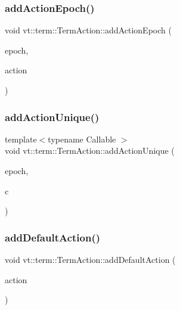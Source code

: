 \subsubsection{\texorpdfstring{add\+Action\+Epoch()}{addActionEpoch()}}
{\footnotesize\ttfamily void vt\+::term\+::\+Term\+Action\+::add\+Action\+Epoch (\begin{DoxyParamCaption}\item[{\hyperlink{namespacevt_a81d11b28122d43bf9834577e4a06440f}{Epoch\+Type} const \&}]{epoch,  }\item[{\hyperlink{namespacevt_ae0a5a7b18cc99d7b732cb4d44f46b0f3}{Action\+Type}}]{action }\end{DoxyParamCaption})}

\mbox{\label{structvt_1_1term_1_1_term_action_a3ccd1689f56ab62821cfa6b1e65fc60b}} 
\subsubsection{\texorpdfstring{add\+Action\+Unique()}{addActionUnique()}}
{\footnotesize\ttfamily template$<$typename Callable $>$ \\
void vt\+::term\+::\+Term\+Action\+::add\+Action\+Unique (\begin{DoxyParamCaption}\item[{\hyperlink{namespacevt_a81d11b28122d43bf9834577e4a06440f}{Epoch\+Type} const \&}]{epoch,  }\item[{Callable \&\&}]{c }\end{DoxyParamCaption})}

\mbox{\label{structvt_1_1term_1_1_term_action_a9e9e174482720b4886ea4e8c38ead0d7}} 
\subsubsection{\texorpdfstring{add\+Default\+Action()}{addDefaultAction()}}
{\footnotesize\ttfamily void vt\+::term\+::\+Term\+Action\+::add\+Default\+Action (\begin{DoxyParamCaption}\item[{\hyperlink{namespacevt_ae0a5a7b18cc99d7b732cb4d44f46b0f3}{Action\+Type}}]{action }\end{DoxyParamCaption})}

